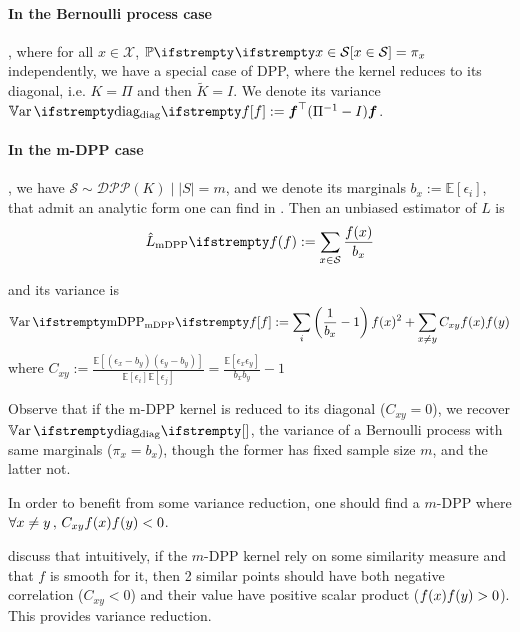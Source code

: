 \paragraph{In the Bernoulli process case}, where for all $x \in \mathcal{X}$, $\PP{}{x \in \mathcal S} = \pi_x$ independently, we have a special case of DPP, where the kernel reduces to its diagonal, i.e. $K = \Pi$ and then $\tilde K = I$. We denote its variance $\Var{\textrm{diag}}{f} := \boldsymbol\query\T (\Pi^{-1}  - I) \boldsymbol\query $.


\paragraph{In the m-DPP case}, we have $\mathcal S \sim \mathcal{DPP}(K) \mid |S|=m$, and we denote its marginals $b_{x} := \mathbb{E}\left[\epsilon_{i}\right]$, that admit an analytic form one can find in \cite{kulesza2012_dpp_for_ml}. Then an unbiased estimator of $L$ is
\begin{equation*}
	\estloss{\textrm{mDPP}}{\query} := \sum_{x\in \mathcal S} \frac{\query(x)}{b_x}
\end{equation*}

and its variance is
\begin{equation}
	\Var{\textrm{mDPP}}{\query}:=\sum_{i}\left(\frac{1}{b_x}-1\right) \query(x)^2
	+ \sum_{x \neq y} C_{xy}\query(x) \query(y)
\end{equation}
where $C_{xy}:=\frac{\mathbb{E}\left[\left(\epsilon_{x}-b_{y}\right)\left(\epsilon_{y}-b_{y}\right)\right]}{\mathbb{E}\left[\epsilon_{i}\right] \mathbb{E}\left[\epsilon_{j}\right]}=\frac{\mathbb{E}\left[\epsilon_{x} \epsilon_{y}\right]}{b_{x} b_{y}}-1
$

Observe that if the m-DPP kernel is reduced to its diagonal ($C_{xy} = 0$), we recover $\Var{\textrm{diag}}{}$, the variance of a Bernoulli process with same marginals ($\pi_x = b_x$), though the former has fixed sample size $m$, and the latter not.

In order to benefit from some variance reduction, one should find a $m$-DPP where $\forall x\neq y \,,\, C_{xy}f(x) f(y) <0$.

\cite{zhang2017dppminibatch} discuss that intuitively, if the $m$-DPP kernel rely on some similarity measure and that $f$ is smooth for it, then 2 similar points should have both negative correlation ($C_{xy}<0$) and their value have positive scalar product ($f(x) f(y) > 0$). This provides variance reduction.

